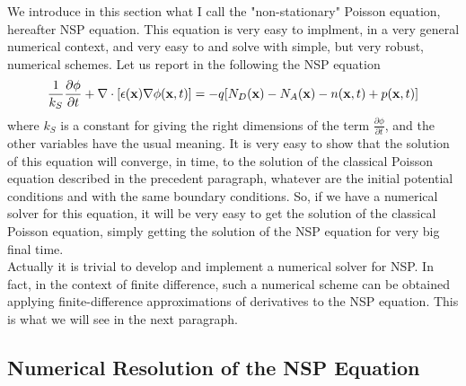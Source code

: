 \documentclass[12pt]{book}
\begin{document}
We introduce in this section what I call the "non-stationary" Poisson equation, hereafter NSP equation. This equation is very easy to implment, in a very general numerical context, and very easy to and solve with simple, but very robust, numerical schemes. Let us report in the following the NSP equation
\begin{equation}
 \frac{1}{k_S} \frac{\partial \phi}{\partial t} + \nabla \cdot [ \epsilon ({\bf{x}}) \nabla \phi ({\bf{x}},t) ] = 
 - q [ N_D({\bf{x}}) - N_A({\bf{x}}) - n({\bf{x}},t) + p({\bf{x}},t)]
\end{equation}
where $k_S$ is a constant for giving the right dimensions of the term $\frac{\partial \phi}{\partial t}$, and the other variables have the usual meaning.
It is very easy to show that the solution of this equation will converge, in time, to the solution of the classical Poisson equation described in the precedent paragraph, whatever are the initial potential conditions and with the same boundary conditions. So, if we have a numerical solver for this equation, it will be very easy to get the solution of the classical Poisson equation, simply getting the solution of the NSP equation for very big final time.
\\
Actually it is trivial to develop and implement a numerical solver for NSP. In fact, in the context of finite difference, such a numerical scheme can be obtained applying finite-difference approximations of derivatives to the NSP equation. This is what we will see in the next paragraph.

\subsection{Numerical Resolution of the NSP Equation}
\end{document}
